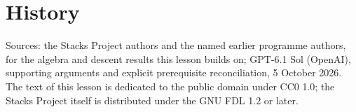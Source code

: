 \documentclass[11pt,a4paper,openany]{report}
\begin{document}
\section{History}\label{AG-RG-S08-history}

Sources: the Stacks Project authors and the named earlier programme authors, for the algebra and descent results this lesson builds on; GPT-6.1 Sol (OpenAI), supporting arguments and explicit prerequisite reconciliation, 5 October 2026. The text of this lesson is dedicated to the public domain under CC0 1.0; the Stacks Project itself is distributed under the GNU FDL 1.2 or later.
\end{document}
